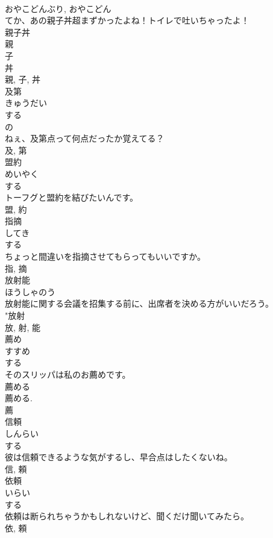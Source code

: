 \documentclass[8pt]{extreport}
\begin{document}
\begin{CJK}{UTF8}{min}
\\	おやこどんぶり, おやこどん	
\\	てか、あの親子丼超まずかったよね！トイレで吐いちゃったよ！	
\\	親子丼 
\\	親 
\\	子 
\\	丼 
\\	親, 子, 丼	
\\	及第	
\\	きゅうだい	
\\	する 
\\	の 
\\	ねぇ、及第点って何点だったか覚えてる？	
\\	及, 第	
\\	盟約	
\\	めいやく	
\\	する 
\\	トーフグと盟約を結びたいんです。	
\\	盟, 約	
\\	指摘	
\\	してき	
\\	する 
\\	ちょっと間違いを指摘させてもらってもいいですか。	
\\	指, 摘	
\\	放射能	
\\	ほうしゃのう	
\\	放射能に関する会議を招集する前に、出席者を決める方がいいだろう。	
\\	"放射 
\\	放, 射, 能	
\\	薦め	
\\	すすめ	
\\	する 
\\	そのスリッパは私のお薦めです。	
\\	薦める 
\\	薦める. 
\\	薦	
\\	信頼	
\\	しんらい	
\\	する 
\\	彼は信頼できるような気がするし、早合点はしたくないね。	
\\	信, 頼	
\\	依頼	
\\	いらい	
\\	する 
\\	依頼は断られちゃうかもしれないけど、聞くだけ聞いてみたら。	
\\	依, 頼	

\end{CJK}
\end{document}
